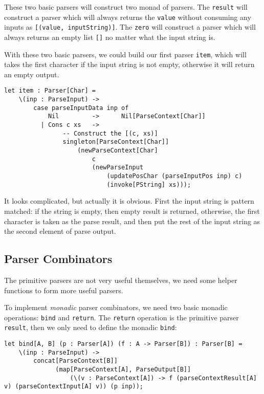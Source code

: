These two basic parsers will construct two monad of parsers. The \texttt{result} will construct a parser which will always returns the \texttt{value} without consuming any inputs as \texttt{[(value, inputString)]}. The \texttt{zero} will construct a parser which will always returns an empty list \texttt{[]} no matter what the input string is.

With these two basic parsers, we could build our first parser \texttt{item}, which will takes the first character if the input string is not empty, otherwise it will return an empty output.

\begin{lstlisting}
let item : Parser[Char] =
    \(inp : ParseInput) ->
        case parseInputData inp of
            Nil         ->      Nil[ParseContext[Char]]
          | Cons c xs   ->
                -- Construct the [(c, xs)]
                singleton[ParseContext[Char]]
                    (newParseContext[Char]
                        c
                        (newParseInput
                            (updatePosChar (parseInputPos inp) c)
                            (invoke[PString] xs)));
\end{lstlisting}

It looks complicated, but actually it is obvious. First the input string is pattern matched: if the string is empty, then empty result is returned, otherwise, the first character is taken as the parse result, and then put the rest of the input string as the second element of parse output.

\subsection{Parser Combinators}

The primitive parsers are not very useful themselves, we need some helper functions to form more useful parsers.

To implement \textit{monadic} parser combinators, we need two basic monadic operations: \texttt{bind} and \texttt{return}. The \texttt{return} operation is the primitive parser \texttt{result}, then we only need to define the monadic \texttt{bind}:

\begin{lstlisting}
let bind[A, B] (p : Parser[A]) (f : A -> Parser[B]) : Parser[B] =
    \(inp : ParseInput) ->
        concat[ParseContext[B]]
              (map[ParseContext[A], ParseOutput[B]]
                  (\(v : ParseContext[A]) -> f (parseContextResult[A] v) (parseContextInput[A] v)) (p inp));
\end{lstlisting}

